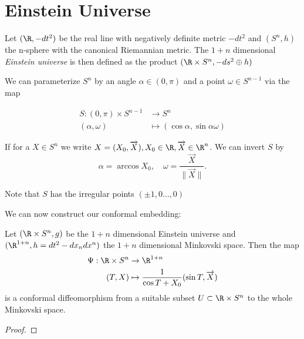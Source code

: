 \section{Einstein Universe}

\begin{definition}
Let $(\R,-dt^2)$ be the real line with negatively definite metric $-dt^2$ and $(S^n,h)$ the n-sphere with the canonical Riemannian metric. The $1+n$ dimensional \emph{Einstein universe} is then defined as the product $(\R\times S^n, -ds^2 \oplus h)$
\end{definition}

\begin{remark}
We can parameterize $S^n$ by an angle $\alpha\in (0,\pi)$ and a point $\omega\in S^{n-1}$ via the map 

\begin{align*}
    S:(0,\pi)\times S^{n-1}&\to S^n \\
    (\alpha,\omega) &\mapsto (\cos \alpha, \sin \alpha \omega)
\end{align*}

If for a $X\in S^n$ we write $X=(X_0,\overrightarrow{X}), X_0\in \R, \overrightarrow{X}\in \R^n$. We can invert $S$ by 
\[
    \alpha = \arccos X_0, \quad \omega=\frac{\overrightarrow{X}}{\lVert\overrightarrow{X}\rVert}.
\]

Note that $S$ has the irregular points $(\pm 1,0\dots,0)$
\end{remark}

We can now construct our conformal embedding:

\begin{proposition}
Let $(\R\times S^n,g)$ be the $1+n$ dimensional Einstein universe and $(\R^{1+n},h=dt^2-dx_ndx^n)$ the $1+n$ dimensional Minkovski space. Then the map 
\begin{align}
    \Psi:\R\times S^n &\to \R^{1+n}\\
    (T,X) &\mapsto\frac{1}{\cos T + X_0}(\sin T,\overrightarrow{X})
\end{align}
is a conformal diffeomorphism from a suitable subset $U\subset \R\times S^n$ to the whole Minkovski space.
\end{proposition}
\begin{proof}
\end{proof}

